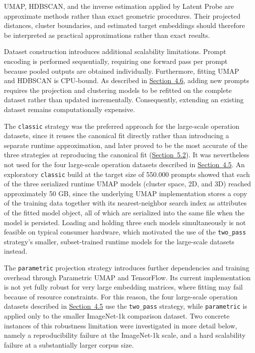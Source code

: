 UMAP, HDBSCAN, and the inverse estimation applied by Latent Probe are approximate methods rather than exact geometric procedures. Their projected distances, cluster boundaries, and estimated target embeddings should therefore be interpreted as practical approximations rather than exact results.

Dataset construction introduces additional scalability limitations. Prompt encoding is performed sequentially, requiring one forward pass per prompt because pooled outputs are obtained individually. Furthermore, fitting UMAP and HDBSCAN is CPU-bound. As described in \hyperref[sec:4.6]{Section~4.6}, adding new prompts requires the projection and clustering models to be refitted on the complete dataset rather than updated incrementally. Consequently, extending an existing dataset remains computationally expensive.

The \texttt{classic} strategy was the preferred approach for the large-scale operation datasets, since it reuses the canonical fit directly rather than introducing a separate runtime approximation, and later proved to be the most accurate of the three strategies at reproducing the canonical fit (\hyperref[sec:5.2]{Section~5.2}). It was nevertheless not used for the four large-scale operation datasets described in \hyperref[sec:4.5]{Section~4.5}. An exploratory \texttt{classic} build at the target size of 550.000 prompts showed that each of the three serialized runtime UMAP models (cluster space, 2D, and 3D) reached approximately 50 GB, since the underlying UMAP implementation stores a copy of the training data together with its nearest-neighbor search index as attributes of the fitted model object, all of which are serialized into the same file when the model is persisted. Loading and holding three such models simultaneously is not feasible on typical consumer hardware, which motivated the use of the \texttt{two\_pass} strategy's smaller, subset-trained runtime models for the large-scale datasets instead.

The \texttt{parametric} projection strategy introduces further dependencies and training overhead through Parametric UMAP and TensorFlow. Its current implementation is not yet fully robust for very large embedding matrices, where fitting may fail because of resource constraints. For this reason, the four large-scale operation datasets described in \hyperref[sec:4.5]{Section~4.5} use the \texttt{two\_pass} strategy, while \texttt{parametric} is applied only to the smaller ImageNet-1k comparison dataset. Two concrete instances of this robustness limitation were investigated in more detail below, namely a reproducibility failure at the ImageNet-1k scale, and a hard scalability failure at a substantially larger corpus size.

